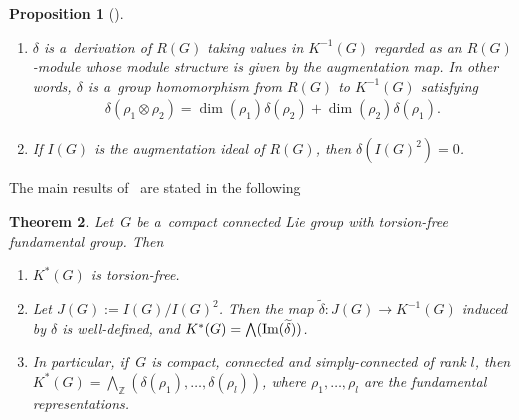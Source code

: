 \documentclass[pdftex]{sigma}
\numberwithin{equation}{section}
\newtheorem{Theorem}{Theorem}[section]
\newtheorem{Proposition}[Theorem]{Proposition}
{\theoremstyle{definition}
\newtheorem{Definition}[Theorem]{Definition}
\newtheorem{Example}[Theorem]{Example}
\newtheorem{Remark}[Theorem]{Remark}
}
\begin{document}
\begin{Proposition}[\cite{Ho}]\label{noneqderivation}\quad
\begin{enumerate}\itemsep=0pt
\item[$1.$]
$\delta$ is a~derivation of $R(G)$ taking values in $K^{-1}(G)$ regarded as an $R(G)$-module whose module structure is
given by the augmentation map.
In other words, $\delta$ is a~group homomorphism from $R(G)$ to $K^{-1}(G)$ satisfying
\begin{gather}
\label{leibniz}
\delta(\rho_1\otimes\rho_2)=\dim(\rho_1)\delta(\rho_2)+\dim(\rho_2)\delta(\rho_1).
\end{gather}
\item[$2.$]
If $I(G)$ is the augmentation ideal of $R(G)$, then $\delta(I(G)^2)=0$.
\end{enumerate}
\end{Proposition}

The main results of~\cite{Ho} are stated in the following
\begin{Theorem}
\label{hodgkin}
Let~$G$ be a~compact connected Lie group with torsion-free fundamental group.
Then
\begin{enumerate}\itemsep=0pt
\item[$1.$]
$K^*(G)$ is torsion-free.
\item[$2.$]
Let $J(G):=I(G)/I(G)^2$.
Then the map $\widetilde{\delta}: J(G)\to K^{-1}(G)$ induced by $\delta$ is well-defined, and
$K^*(G)=\bigwedge(\text{\rm Im}(\widetilde{\delta}))$.
\item[$3.$]
In particular, if~$G$ is compact, connected and simply-connected of rank $l$, then
$K^*(G)=\bigwedge_{\mathbb{Z}}(\delta(\rho_1), \dots, \delta(\rho_l))$, where $\rho_1, \dots, \rho_l$ are the
fundamental representations.
\end{enumerate}
\end{Theorem}
\end{document}
